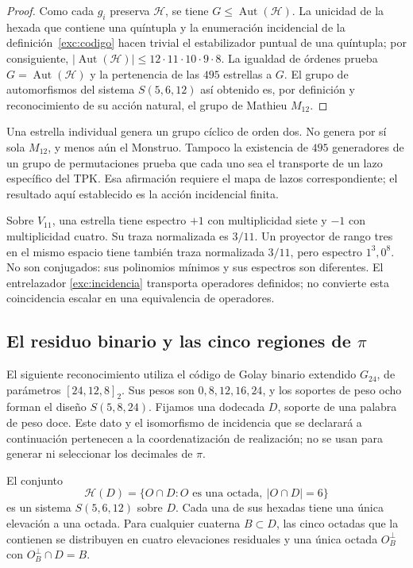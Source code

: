 \begin{proof}
Como cada $g_i$ preserva $\mathcal H$, se tiene
$G\leq\operatorname{Aut}(\mathcal H)$. La unicidad de la hexada que
contiene una quíntupla y la enumeración incidencial de la
definición~\ref{exc:codigo} hacen trivial el estabilizador puntual de una
quíntupla; por consiguiente,
$|\operatorname{Aut}(\mathcal H)|\leq
12\cdot11\cdot10\cdot9\cdot8$. La igualdad de órdenes prueba
$G=\operatorname{Aut}(\mathcal H)$ y la pertenencia de las $495$ estrellas
a $G$. El grupo de automorfismos del sistema $S(5,6,12)$ así obtenido es,
por definición y reconocimiento de su acción natural, el grupo de Mathieu
$M_{12}$.
\end{proof}

Una estrella individual genera un grupo cíclico de orden dos. No
genera por sí sola $M_{12}$, y menos aún el Monstruo. Tampoco la
existencia de $495$ generadores de un grupo de permutaciones prueba que
cada uno sea el transporte de un lazo específico del TPK. Esa afirmación
requiere el mapa de lazos correspondiente; el resultado aquí establecido
es la acción incidencial finita.

\begin{remark}
Sobre $V_{11}$, una estrella tiene espectro $+1$ con multiplicidad siete
y $-1$ con multiplicidad cuatro. Su traza normalizada es $3/11$.
Un proyector de rango tres en el mismo espacio tiene también traza
normalizada $3/11$, pero espectro $1^3,0^8$. No son conjugados: sus
polinomios mínimos y sus espectros son diferentes. El entrelazador
\eqref{exc:incidencia} transporta operadores definidos; no convierte
esta coincidencia escalar en una equivalencia de operadores.
\end{remark}

\subsection{El residuo binario y las cinco regiones de \texorpdfstring{$\pi$}{pi}}
\label{exc:cinco-regiones}

El siguiente reconocimiento utiliza el código de Golay binario
extendido $G_{24}$, de parámetros $[24,12,8]_2$. Sus pesos son
$0,8,12,16,24$, y los soportes de peso ocho forman el diseño
$S(5,8,24)$. Fijamos una dodecada $D$, soporte de una palabra de peso
doce. Este dato y el isomorfismo de incidencia que se declarará a
continuación pertenecen a la coordenatización de realización; no se usan para
generar ni seleccionar los decimales de $\pi$.

\begin{proposition}
\label{exc:residuo-binario}
El conjunto
\[
 \mathcal H(D)=
 \{O\cap D: O\text{ es una octada},\ |O\cap D|=6\}
\]
es un sistema $S(5,6,12)$ sobre $D$. Cada una de sus hexadas tiene
una única elevación a una octada. Para cualquier cuaterna $B\subset D$,
las cinco octadas que la contienen se distribuyen en cuatro elevaciones
residuales y una única octada $O_B^\perp$ con $O_B^\perp\cap D=B$.
\end{proposition}

